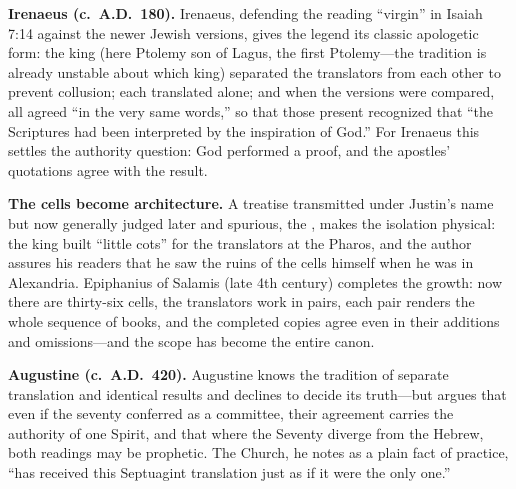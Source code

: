 \textbf{Irenaeus (c.~A.D.~180).} Irenaeus, defending the reading ``virgin''
in Isaiah 7:14 against the newer Jewish versions, gives the legend its
classic apologetic form: the king (here Ptolemy son of Lagus, the first
Ptolemy---the tradition is already unstable about which king) separated the
translators from each other to prevent collusion; each translated alone;
and when the versions were compared, all agreed ``in the very same words,''
so that those present recognized that ``the Scriptures had been interpreted
by the inspiration of God.'' For Irenaeus this settles the authority
question: God performed a proof, and the apostles' quotations agree with the
result.

\textbf{The cells become architecture.} A treatise transmitted under
Justin's name but now generally judged later and spurious, the
, makes the isolation physical: the
king built ``little cots'' for the translators at the Pharos, and the
author assures his readers that he saw the ruins of the cells himself when
he was in Alexandria. Epiphanius of Salamis (late 4th century)
completes the growth: now there are thirty-six cells, the translators work
in pairs, each pair renders the whole sequence of books, and the
completed copies agree even in their additions and omissions---and the
scope has become the entire canon.

\textbf{Augustine (c.~A.D.~420).} Augustine knows the tradition of separate
translation and identical results and declines to decide its truth---but
argues that even if the seventy conferred as a committee, their agreement
carries the authority of one Spirit, and that where the Seventy diverge
from the Hebrew, both readings may be prophetic. The Church, he notes as a
plain fact of practice, ``has received this Septuagint translation just as
if it were the only one.''

